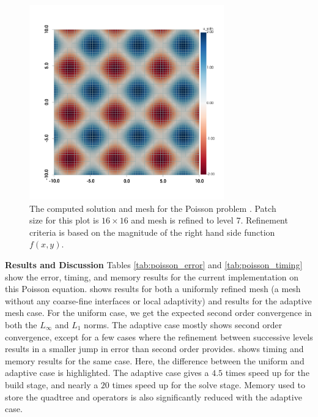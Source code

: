 \begin{figure}
    \centering
    \includegraphics[width=0.75\textwidth, trim={0 100 0 0}]{figures/plot_poisson.png}
    \caption{The computed solution and mesh for the Poisson problem .  Patch size for this plot is $16 \times 16$ and mesh is refined to level 7.  Refinement criteria is based on the magnitude of the right hand side function $f(x,y)$.}
    \label{fig:poisson_plot}
\end{figure}

{\bf Results and Discussion}
Tables \ref{tab:poisson_error} and \ref{tab:poisson_timing} show the error, timing, and memory results for the current implementation on this Poisson equation.  shows results for both a uniformly refined mesh (a mesh without any coarse-fine interfaces or local adaptivity) and results for the adaptive mesh case. For the uniform case, we get the expected second order convergence in both the $L_{\infty}$ and $L_1$ norms. The adaptive case mostly shows second order convergence, except for a few cases where the refinement between successive levels results in a smaller jump in error than second order provides.  shows timing and memory results for the same case. Here, the difference between the uniform and adaptive case is highlighted. The adaptive case gives a $4.5$ times speed up for the build stage, and nearly a $20$ times speed up for the solve stage. Memory used to store the quadtree and operators is also significantly reduced with the adaptive case.

